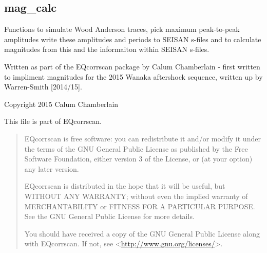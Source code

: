 \documentclass[a4paper,10pt,english]{sphinxmanual}
\begin{document}
\subsection{mag\_calc}
\label{utils:module-mag_calc}\label{utils:mag-calc}
Functions to simulate Wood Anderson traces, pick maximum peak-to-peak amplitudes
write these amplitudes and periods to SEISAN s-files and to calculate magnitudes
from this and the informaiton within SEISAN s-files.

Written as part of the EQcorrscan package by Calum Chamberlain - first written
to impliment magnitudes for the 2015 Wanaka aftershock sequence, written up
by Warren-Smith {[}2014/15{]}.

Copyright 2015 Calum Chamberlain

This file is part of EQcorrscan.
\begin{quote}

EQcorrscan is free software: you can redistribute it and/or modify
it under the terms of the GNU General Public License as published by
the Free Software Foundation, either version 3 of the License, or
(at your option) any later version.

EQcorrscan is distributed in the hope that it will be useful,
but WITHOUT ANY WARRANTY; without even the implied warranty of
MERCHANTABILITY or FITNESS FOR A PARTICULAR PURPOSE.  See the
GNU General Public License for more details.

You should have received a copy of the GNU General Public License
along with EQcorrscan.  If not, see \textless{}\href{http://www.gnu.org/licenses/}{http://www.gnu.org/licenses/}\textgreater{}.
\end{quote}
\end{document}
